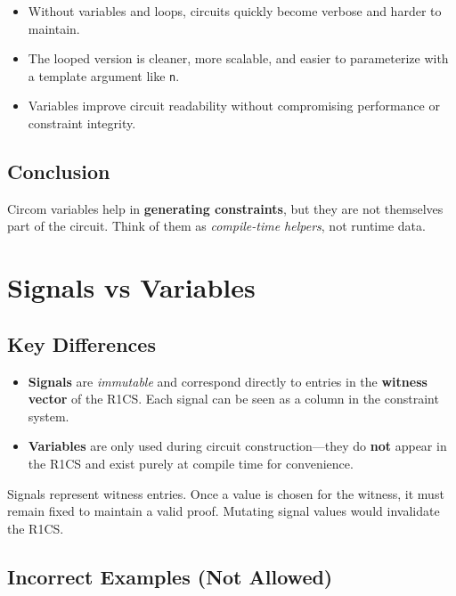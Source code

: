\documentclass{article}
\begin{document}
\begin{itemize}
	\item Without variables and loops, circuits quickly become verbose and harder to maintain.
	\item The looped version is cleaner, more scalable, and easier to parameterize with a template argument like \texttt{n}.
	\item Variables improve circuit readability without compromising performance or constraint integrity.
\end{itemize}

\subsection*{Conclusion}

Circom variables help in \textbf{generating constraints}, but they are not themselves part of the circuit. Think of them as \emph{compile-time helpers}, not runtime data.

	\section*{Signals vs Variables}
	
	\subsection*{Key Differences}
	
	\begin{itemize}
		\item \textbf{Signals} are \textit{immutable} and correspond directly to entries in the \textbf{witness vector} of the R1CS. Each signal can be seen as a column in the constraint system.
		\item \textbf{Variables} are only used during circuit construction—they do \textbf{not} appear in the R1CS and exist purely at compile time for convenience.
	\end{itemize}
	
	\begin{tcolorbox}[colback=gray!5, colframe=black!50, title=Why Signals Are Immutable]
		Signals represent witness entries. Once a value is chosen for the witness, it must remain fixed to maintain a valid proof. Mutating signal values would invalidate the R1CS.
	\end{tcolorbox}
	
	\subsection*{Incorrect Examples (Not Allowed)}
	
\end{document}
